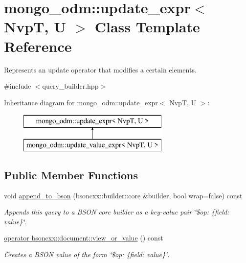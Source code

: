 \hypertarget{classmongo__odm_1_1update__expr}{}\section{mongo\+\_\+odm\+:\+:update\+\_\+expr$<$ NvpT, U $>$ Class Template Reference}
\label{classmongo__odm_1_1update__expr}


Represents an update operator that modifies a certain elements.  




{\ttfamily \#include $<$query\+\_\+builder.\+hpp$>$}

Inheritance diagram for mongo\+\_\+odm\+:\+:update\+\_\+expr$<$ NvpT, U $>$\+:\begin{figure}[H]
\begin{center}
\leavevmode
\includegraphics[height=2.000000cm]{classmongo__odm_1_1update__expr}
\end{center}
\end{figure}
\subsection*{Public Member Functions}
\begin{DoxyCompactItemize}
\item 
void \hyperlink{classmongo__odm_1_1update__expr_a3b1e28aca88052a9862ed528afe3d434}{append\+\_\+to\+\_\+bson} (bsoncxx\+::builder\+::core \&builder, bool wrap=false) const 
\begin{DoxyCompactList}\small\item\em Appends this query to a B\+S\+ON core builder as a key-\/value pair \char`\"{}\$op\+: \{field\+: value\}\char`\"{}. \end{DoxyCompactList}\item 
\hyperlink{classmongo__odm_1_1update__expr_abb04ef8b7c4212749d35b4c0ba98b34f}{operator bsoncxx\+::document\+::view\+\_\+or\+\_\+value} () const \hypertarget{classmongo__odm_1_1update__expr_abb04ef8b7c4212749d35b4c0ba98b34f}{}\label{classmongo__odm_1_1update__expr_abb04ef8b7c4212749d35b4c0ba98b34f}

\begin{DoxyCompactList}\small\item\em Creates a B\+S\+ON value of the form \char`\"{}\$op\+: \{field\+: value\}\char`\"{}. \end{DoxyCompactList}\end{DoxyCompactItemize}


